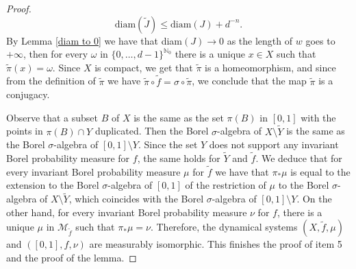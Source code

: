 \documentclass[10pt,a4paper]{amsart}
\numberwithin{equation}{section} %
\numberwithin{figure}{section} %
\newcommand{\N}{\mathbb{N}}
\renewcommand{\=}{\coloneqq}
\begin{document}
\begin{proof}
    \begin{equation}
        \text{diam}(\widetilde{J})\leq \text{diam}(J) + d^{-n}.
    \end{equation}
    By Lemma \ref{diam to 0} we have that diam$(J) \to 0$ as the length of $w$ goes to $+\infty$, then for every $\omega$ in $\{0,\ldots,d-1\}^{\N_0}$ there is a unique $x\in X$ such that $\widetilde{\pi}(x) = \omega$. Since $X$ is compact, we get that $\widetilde{\pi}$ is a homeomorphism, and since from the definition of $\widetilde{\pi}$ we have $\widetilde{\pi}\circ \widetilde{f}= \sigma\circ \widetilde{\pi}$, we conclude that the map $\widetilde{\pi}$ is a conjugacy.

    Observe that a subset $B$ of $X$ is the same as the set $\pi(B)$ in $[0,1]$ with the points in $\pi(B)\cap Y$ duplicated. Then the Borel $\sigma$-algebra of $X\setminus \widetilde{Y}$ is the same as the Borel $\sigma$-algebra of $[0,1]\setminus Y$. Since the set $Y$ does not support any invariant Borel probability measure for $f$, the same holds for $\widetilde{Y}$ and $\widetilde{f}.$ We deduce that for every invariant Borel probability measure $\mu$ for $\widetilde{f}$ we have that $\pi_*\mu$ is equal to the extension to the Borel $\sigma$-algebra of $[0,1]$ of the restriction of $\mu$ to the Borel $\sigma$-algebra of $X\setminus \widetilde{Y}$, which coincides with the Borel $\sigma$-algebra of $[0,1]\setminus Y$. On the other hand, for every invariant Borel probability measure $\nu$ for $f$, there is a unique $\mu$ in $\mathcal{M}_{\widetilde{f}}$ such that $\pi_*\mu = \nu$. Therefore, the dynamical systems $(X,\widetilde{f},\mu)$ and $([0,1],f,\nu)$ are measurably isomorphic. This finishes the proof of item 5 and the proof of the lemma.
\end{proof}
\end{document}

